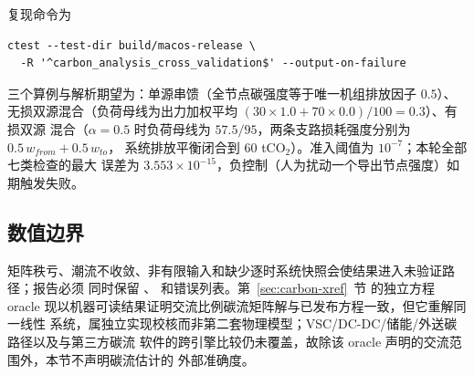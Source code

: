复现命令为
\begin{verbatim}
ctest --test-dir build/macos-release \
  -R '^carbon_analysis_cross_validation$' --output-on-failure
\end{verbatim}

三个算例与解析期望为：单源串馈（全节点碳强度等于唯一机组排放因子 $0.5$）、
无损双源混合（负荷母线为出力加权平均 $(30\times1.0+70\times0.0)/100=0.3$）、有损双源
混合（$\alpha=0.5$ 时负荷母线为 $57.5/95$，两条支路损耗强度分别为 $0.5\,w_{from}+0.5\,w_{to}$，
系统排放平衡闭合到 $60$ tCO$_2$）。准入阈值为 $10^{-7}$；本轮全部七类检查的最大
误差为 $3.553\times10^{-15}$，负控制（人为扰动一个导出节点强度）如期触发失败。

\subsection{数值边界}
矩阵秩亏、潮流不收敛、非有限输入和缺少逐时系统快照会使结果进入未验证路径；报告必须
同时保留 、 和错误列表。第~\ref{sec:carbon-xref}~节
的独立方程 oracle 现以机器可读结果证明交流比例碳流矩阵解与已发布方程一致，但它重解同一线性
系统，属独立实现校核而非第二套物理模型；VSC/DC-DC/储能/外送碳路径以及与第三方碳流
软件的跨引擎比较仍未覆盖，故除该 oracle 声明的交流范围外，本节不声明碳流估计的
外部准确度。
